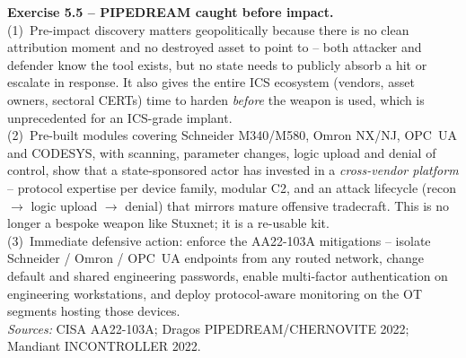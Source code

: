 \documentclass[11pt,a4paper]{article}
\begin{document}
\begin{solutionbox}
\textbf{Exercise 5.5 -- PIPEDREAM caught before impact.}\\
(1)~Pre-impact discovery matters geopolitically because there is no clean attribution moment
and no destroyed asset to point to -- both attacker and defender know the tool exists, but no
state needs to publicly absorb a hit or escalate in response. It also gives the entire ICS
ecosystem (vendors, asset owners, sectoral CERTs) time to harden \emph{before} the weapon
is used, which is unprecedented for an ICS-grade implant.\\
(2)~Pre-built modules covering Schneider M340/M580, Omron NX/NJ, OPC~UA and CODESYS, with
scanning, parameter changes, logic upload and denial of control, show that a state-sponsored
actor has invested in a \emph{cross-vendor platform} -- protocol expertise per device family,
modular C2, and an attack lifecycle (recon $\to$ logic upload $\to$ denial) that mirrors
mature offensive tradecraft. This is no longer a bespoke weapon like Stuxnet; it is a
re-usable kit.\\
(3)~Immediate defensive action: enforce the AA22-103A mitigations -- isolate Schneider /
Omron / OPC~UA endpoints from any routed network, change default and shared engineering
passwords, enable multi-factor authentication on engineering workstations, and deploy
protocol-aware monitoring on the OT segments hosting those devices.\\[2pt]
\emph{Sources:} CISA AA22-103A; Dragos PIPEDREAM/CHERNOVITE 2022; Mandiant INCONTROLLER 2022.
\end{solutionbox}
\end{document}
